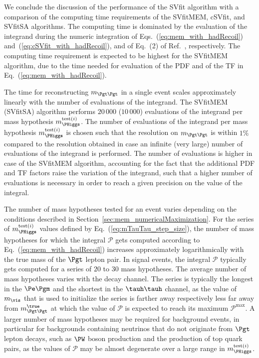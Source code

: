 We conclude the discussion of the performance of the SVfit algorithm
with a comparison of the computing time requirements of the SVfitMEM,
cSVfit, and SVfitSA algorithms.
The computing time is dominated by the
evaluation of the integrand during the numeric integration of Eqs.~(\ref{eq:mem_with_hadRecoil}) and~(\ref{eq:cSVfit_with_hadRecoil}), and of Eq.~(2) of Ref.~\cite{SVfit}, respectively.
The computing time requirement is expected to be
highest for the SVfitMEM algorithm, due to the time needed for evaluation of the PDF and of the TF in Eq.~(\ref{eq:mem_with_hadRecoil}).

The time for reconstructing $m_{\Pgt\Pgt}$ in a single event scales approximately linearly
with the number of evaluations of the integrand.
The SVfitMEM (SVfitSA) algorithm performs $20\,000$ ($10\,000$)
evaluations of the integrand per mass hypothesis
$m_{\PHiggs}^{\textrm{test}(i)}$.
The number of evaluations of the integrand per mass hypothesis $m_{\PHiggs}^{\textrm{test}(i)}$ is chosen such that the
resolution on $m_{\Pgt\Pgt}$ is within $1\%$ compared to the resolution obtained in case an infinite (very large) number of evaluations of the
integrand is performed.
The number of evaluations is higher in case of the SVfitMEM algorithm, 
accounting for the fact that the additional PDF and TF factors raise the variation of the integrand, 
such that a higher number of evaluations is necessary in order to reach a given precision on the value of the integral.

The number of mass hypotheses tested for an event varies depending on the
conditions described in Section~\ref{sec:mem_numericalMaximization}.
For the series of $m_{\PHiggs}^{\textrm{test}(i)}$ values defined by Eq.~(\ref{eq:mTauTau_step_size}),
the number of mass hypotheses for which the integral $\mathcal{P}$ gets computed according to Eq.~(\ref{eq:mem_with_hadRecoil}) 
increases approximately logarithmically with the true mass of the $\Pgt$ lepton pair. 
In signal events, the integral $\mathcal{P}$
typically gets computed for a series of $20$ to $30$ mass hypotheses.
The average number of mass hypotheses varies with the decay channel.
The series is typically the longest in the $\Pe\Pgm$ and the shortest in the $\tauh\tauh$ channel,
as the value of $m_{\vis}$ that is used to initialize the series is farther away respectively less far away from $m_{\Pgt\Pgt}^{\true}$
at which the value of $\mathcal{P}$ is expected to reach its maximum $\mathcal{P}^{\textrm{max}}$.
A larger number of mass hypotheses may be required for background events,
in particular for backgrounds containing neutrinos that do not originate from $\Pgt$ lepton decays,
such as $\PW$ boson production and the production of top quark pairs,
as the values of $\mathcal{P}$ may be almost degenerate over a large range in $m_{\PHiggs}^{\textrm{test}(i)}$.

